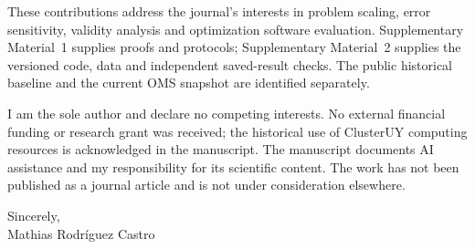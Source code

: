 \documentclass[11pt]{article}
\begin{document}
These contributions address the journal's interests in problem scaling, error
sensitivity, validity analysis and optimization software evaluation. Supplementary
Material~1 supplies proofs and protocols; Supplementary Material~2 supplies the
versioned code, data and independent saved-result checks. The public historical
baseline and the current OMS snapshot are identified separately.

I am the sole author and declare no competing interests. No external financial funding
or research grant was received; the historical use of ClusterUY computing resources is
acknowledged in the manuscript.
The manuscript documents AI assistance and my responsibility for its scientific content.
The work has not been published as a journal article and is not under consideration
elsewhere.

\bigskip
\noindent Sincerely,\\[6pt]
Mathias Rodr\'iguez Castro
\end{document}
